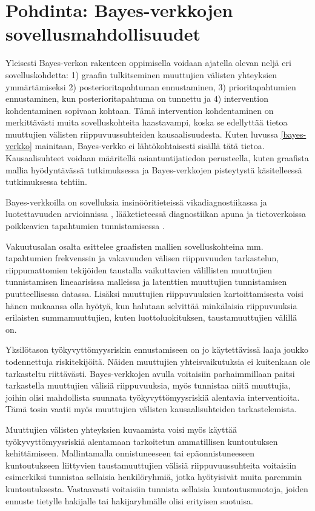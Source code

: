 \chapter{Pohdinta: Bayes-verkkojen sovellusmahdollisuudet \label{conclusions}}
Yleisesti Bayes-verkon rakenteen oppimisella voidaan ajatella olevan neljä eri sovelluskohdetta: 1) graafin tulkitseminen muuttujien välisten yhteyksien ymmärtämiseksi 2) posterioritapahtuman ennustaminen, 3) prioritapahtumien ennustaminen, kun posterioritapahtuma on tunnettu ja 4) intervention kohdentaminen sopivaan kohtaan. Tämä intervention kohdentaminen on merkittävästi muita sovelluskohteita haastavampi, koska se edellyttää tietoa muuttujien välisten riippuvuussuhteiden kausaalisuudesta. Kuten luvussa \ref{bayes-verkko} mainitaan, Bayes-verkko ei lähtökohtaisesti sisällä tätä tietoa. Kausaalisuhteet voidaan määritellä asiantuntijatiedon perusteella, kuten \citet{xu_workplace_2022} graafista mallia hyödyntävässä tutkimuksessa ja \citet{liu_empirical_2012} Bayes-verkkojen pisteytystä käsitelleessä tutkimuksessa tehtiin.

Bayes-verkkoilla on sovelluksia insinööritieteissä vikadiagnostiikassa ja luotettavuuden arvioinnissa \citep{zhang_brief_2019}, lääketieteessä diagnostiikan apuna \citep{mittal_review_2011} ja tietoverkoissa poikkeavien tapahtumien tunnistamisessa \citep{kaur_review_2013}.

Vakuutusalan osalta \citet{ramsahai_connecting_2020} esittelee graafisten mallien sovelluskohteina mm. tapahtumien frekvenssin ja vakavuuden välisen riippuvuuden tarkastelun, riippumattomien tekijöiden taustalla vaikuttavien välillisten muuttujien tunnistamisen lineaarisissa malleissa ja latenttien muuttujien tunnistamisen puutteellisessa datassa. Lisäksi muuttujien riippuvuuksien kartoittamisesta voisi hänen mukaansa olla hyötyä, kun halutaan selvittää minkälaisia riippuvuuksia erilaisten summamuuttujien, kuten luottoluokituksen, taustamuuttujien välillä on. 

Yksilötason työkyvyttömyysriskin ennustamiseen on jo käytettävissä laaja joukko todennettuja riskitekijöitä.  Näiden muuttujien yhteisvaikutuksia ei kuitenkaan ole tarkasteltu riittävästi. Bayes-verkkojen avulla voitaisiin parhaimmillaan paitsi tarkastella muuttujien välisiä riippuvuuksia, myös tunnistaa niitä muuttujia, joihin olisi mahdollista suunnata työkyvyttömyysriskiä alentavia interventioita. Tämä tosin vaatii myös muuttujien välisten kausaalisuhteiden tarkastelemista. 

Muuttujien välisten yhteyksien kuvaamista voisi myös käyttää työkyvyttömyysriskiä alentamaan tarkoitetun ammatillisen kuntoutuksen kehittämiseen. Mallintamalla onnistuneeseen tai epäonnistuneeseen kuntoutukseen liittyvien taustamuuttujien välisiä riippuvuussuhteita voitaisiin esimerkiksi tunnistaa sellaisia henkilöryhmiä, jotka hyötyisivät muita paremmin kuntoutuksesta. Vastaavasti voitaisiin tunnista sellaisia kuntoutusmuotoja, joiden ennuste tietylle hakijalle tai hakijaryhmälle olisi erityisen suotuisa. 

